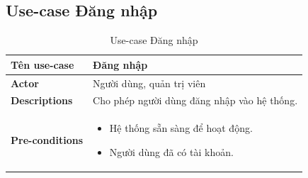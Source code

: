 \subsection{Use-case Đăng nhập}
    \begin{longtable}[H]{|l|p{}|}
        \caption{Use-case Đăng nhập} \\
        \hline
        \textbf{Tên use-case} & Đăng nhập \\
    \hline
        \textbf{Actor} & Người dùng, quản trị viên \\
    \hline
        \textbf{Descriptions} & Cho phép người dùng đăng nhập vào hệ thống. \\
    \hline
        \textbf{Pre-conditions} & \vspace{-1cm} \begin{itemize}[leftmargin=4mm]
            \setlength\itemsep{0em}
            \item Hệ thống sẵn sàng để hoạt động.
            \item Người dùng đã có tài khoản.
        \end{itemize} \\
            

\end{longtable}
